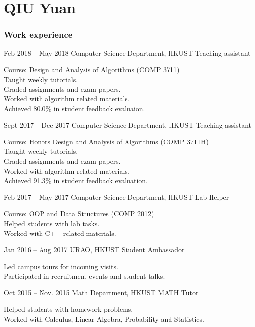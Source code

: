 \documentclass{tccv}
\begin{document}
\part{QIU Yuan}

\section{Work experience}

\begin{eventlist}

\item{Feb 2018 -- May 2018}
     {Computer Science Department, HKUST}
     {Teaching assistant}

Course: Design and Analysis of Algorithms \newline (COMP 3711)\\
Taught weekly tutorials.\\
Graded assignments and exam papers.\\
Worked with algorithm related materials. \\
Achieved 80.0\% in student feedback evaluaion.

\item{Sept 2017 -- Dec 2017}
     {Computer Science Department, HKUST}
     {Teaching assistant}

Course: Honors Design and Analysis of Algorithms \newline (COMP 3711H)\\
Taught weekly tutorials.\\
Graded assignments and exam papers.\\
Worked with algorithm related materials.\\
Achieved 91.3\% in student feedback evaluation.

\item{Feb 2017 -- May 2017}
     {Computer Science Department, HKUST}
     {Lab Helper}

Course: OOP and Data Structures (COMP 2012)\\
Helped students with lab tasks.\\
Worked with C++ related materials.

\item{Jan 2016 -- Aug 2017}
     {URAO, HKUST}
     {Student Ambassador}

Led campus tours for incoming visits.\\
Participated in recruitment events and student talks.

\item{Oct 2015 -- Nov. 2015}
     {Math Department, HKUST}
     {MATH Tutor}

Helped students with homework problems. \\
Worked with Calculus, Linear Algebra, Probability and Statistics.

\end{eventlist}
\end{document}

